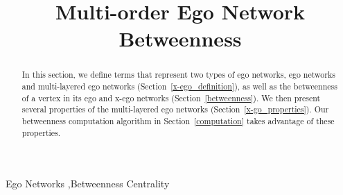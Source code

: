 \documentclass[preprint,12pt,authoryear]{elsarticle}
\theoremstyle{definition}
\begin{document}
\begin{frontmatter}



\title{Multi-order Ego Network Betweenness}


\author{}

\address{}

\begin{abstract}
In this section, we define terms that represent two types of ego networks, ego networks and multi-layered ego networks (Section~\ref{x-ego_definition}), as well as the betweenness of a vertex in its ego and x-ego networks (Section~\ref{betweenness}).
We then present several properties of the multi-layered ego networks (Section~\ref{x-go_properties}).
Our betweenness computation algorithm in Section~\ref{computation} takes advantage of these properties.


\end{abstract}

\begin{keyword}
Ego Networks \sep Betweenness Centrality



\end{keyword}

\end{frontmatter}

\end{document}

